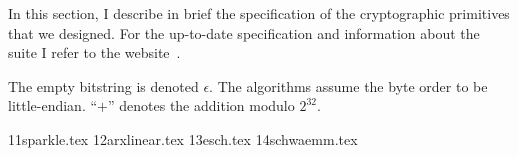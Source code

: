 
In this section, I describe in brief the specification of the cryptographic primitives that we designed. For the up-to-date specification and information about the suite I refer to the website~\cite{sparkle-site}.

The empty bitstring is denoted $\epsilon$. The algorithms assume the byte order to be little-endian. ``$+$'' denotes the addition modulo $2^{32}$. 

{11sparkle.tex}
{12arxlinear.tex}
{13esch.tex}
{14schwaemm.tex}